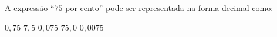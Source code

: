 A expressão ``$75$ por cento'' pode ser representada na forma decimal como:

$0{,}75$
$7{,}5$
$0{,}075$
$75{,}0$
$0{,}0075$




